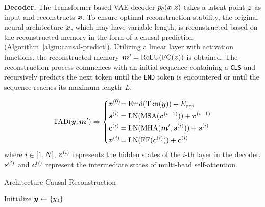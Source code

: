 \documentclass[../main.tex]{subfiles}
\begin{document}
\textbf{Decoder.}\quad
The Transformer-based VAE decoder \( p_{\theta}(\bm{x}|\bm{z}) \) takes a latent point \( \bm{z} \) as input and reconstructs \( \bm{x} \).
To ensure optimal reconstruction stability, the original neural architecture \( \bm{x} \), which may have variable length, is reconstructed based on the reconstructed memory in the form of a causal prediction (Algorithm~\ref{algm:causal-predict}).
Utilizing a linear layer with activation functions, the reconstructed memory \( \bm{m}^\prime = \mathrm{ReLU}(\mathrm{FC}(\bm{z})) \) is obtained.
The reconstruction process commences with an initial sequence containing a {\texttt{CLS}} and recursively predicts the next token until the \texttt{END} token is encountered or until the sequence reaches its maximum length~\( L \).



\begin{equation}
  \mathrm{TAD}(\bm{y};\bm{m}^\prime)\Rightarrow\left\{
  \begin{alignedat}{2}
     & \bm{v}^{(0)} & = {} & \mathrm{Emd} (\mathrm{Tkn} (\bm{y})) + E_\mathrm{pos}                        \\
     & \bm{s}^{(i)} & = {} & \mathrm{LN} (\mathrm{MSA} (\bm{v}^{(i-1)})) + \bm{v}^{(i-1)}              \\
     & \bm{c}^{(i)} & = {} & \mathrm{LN} (\mathrm{MHA} (\bm{m}^\prime, \bm{s}^{(i)})) + \bm{s}^{(i)} \\
     & \bm{v}^{(i)} & = {} & \mathrm{LN} (\mathrm{FF} (\bm{c}^{(i)})) + \bm{c}^{(i)}
  \end{alignedat}\right.
\end{equation}
where \( i \in [1,N] \), \(\bm{v}^{(i)}\) represents the hidden states of the \(i\)-th layer in the decoder.
\(\bm{s}^{(i)}\) and \(\bm{c}^{(i)}\) represent the intermediate states of multi-head self-attention.


\begin{algorithm}[tb]
  \caption{Architecture Causal Reconstruction}\label{algm:causal-predict}
  \SetAlgoLined{}
  \BlankLine
  Initialize \( \bm{y} \gets \{y_0\} \)\;
  \BlankLine
  \BlankLine
  \Return{\( \rectOrig \)}\;
\end{algorithm}
\end{document}
